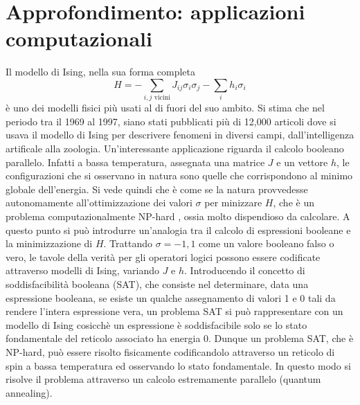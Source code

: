 \documentclass[Lau, noexaminfo, oneside]{sapthesis} %
\begin{document}
\section{Approfondimento: applicazioni computazionali}
Il modello di Ising, nella sua forma completa
\begin{equation}
H = - \sum_{i,j \text{ vicini}} J_{ij} \sigma_i \sigma_j - \sum_i h_i \sigma_i
\end{equation}
è uno dei modelli fisici più usati al di fuori del suo ambito. Si stima che nel periodo tra il 1969 al 1997, siano stati pubblicati più di 12,000 articoli dove si usava il modello di Ising per descrivere fenomeni in diversi campi, dall'intelligenza artificale alla zoologia. \cite{dwave}
Un'interessante applicazione riguarda il calcolo booleano parallelo. Infatti a bassa temperatura, assegnata una matrice $J$ e un vettore $h$, le configurazioni che si osservano in natura sono quelle che corrispondono al minimo globale dell'energia. Si vede quindi che è come se la natura provvedesse autonomamente all'ottimizzazione dei valori $\sigma$ per minizzare $H$, che è un problema computazionalmente NP-hard \cite{nphard}, ossia molto dispendioso da calcolare. A questo punto si può introdurre un'analogia tra il calcolo di espressioni booleane e la minimizzazione di $H$. Trattando $\sigma=-1, 1$ come un valore booleano falso o vero, le tavole della verità per gli operatori logici possono essere codificate attraverso modelli di Ising, variando $J$ e $h$. Introducendo il concetto di soddisfacibilità booleana (SAT), che consiste nel determinare, data una espressione booleana, se esiste un qualche assegnamento di valori 1 e 0 tali da rendere l'intera espressione vera, un problema SAT si può rappresentare con un modello di Ising cosicchè un espressione è soddisfacibile solo se lo stato fondamentale del reticolo associato ha energia 0. Dunque un problema SAT, che è NP-hard, può essere risolto fisicamente codificandolo attraverso un reticolo di spin a bassa temperatura ed osservando lo stato fondamentale. In questo modo si risolve il problema attraverso un calcolo estremamente parallelo (quantum annealing).\cite{quantumannealing}
\end{document}
